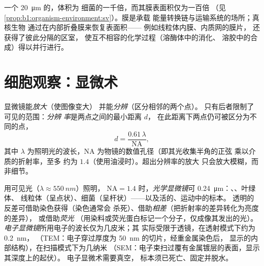 \begin{example}[为何真核细胞要分隔成区室]\label{ex:b1:cell-unit-of-life:whycompart}
一个 \qty{20}{\micro m} 的，体积为
细菌的一千倍，而其膜表面积仅为一百倍
（见\cref{prop:b1:organism-environment:sv}）。膜是承载
能量转换链与运输系统的场所；真核生物
通过在内部折叠膜来恢复表面积——
例如线粒体内膜、内质网的膜片，
还获得了彼此分隔的区室，
使互不相容的化学过程（溶酶体中的消化、
溶胶中的合成）得以并行进行。
\end{example}

\section{细胞观察：显微术}

\begin{definition}[放大率与分辨率]\label{def:b1:cell-unit-of-life:resolution}
显微镜能\emph{放大}（使图像变大）
并能\emph{分辨}（区分相邻的两个点）。
只有后者限制了可见的范围：\emph{分辨
率}是两点之间的最小距离 $d$，
在此距离下两点仍可被区分为不同的点，
\[
d = \frac{0.61\,\lambda}{\mathrm{NA}},
\]
其中 $\lambda$ 为照明光的波长，$\mathrm{NA}$
为物镜的数值孔径（即其光收集半角的正弦
乘以介质的折射率，至多
约为 $1.4$（使用油浸时）。超出分辨率的放大
只会放大模糊，而非细节。
\end{definition}

\begin{proposition}[光学显微镜与电子显微镜]\label{prop:b1:cell-unit-of-life:microscopes}
用可见光（$\lambda \approx \qty{550}{nm}$）照明，
$\mathrm{NA} = 1.4$ 时，\emph{光学显微镜}可 \qty{0.24}{\micro m}：、、叶绿体、
线粒体（呈点状）、细菌（呈杆状）——以及活的、运动中的标本。
透明的反差可借助染色获得（染色通常会
杀死）、借助\emph{相差}（把折射率的差异转化为亮度的差异），
或借助\emph{荧光}
（用染料或荧光蛋白标记一个分子，仅成像其发出的光）。
\emph{电子显微镜}所用电子的波长仅为几皮米；其
实际受限于透镜，在透射模式下约为 \qty{0.2}{nm}，
（TEM：电子穿过厚度为 \qty{50}{nm} 的切片，经重金属染色后，
显示的内部结构），在扫描模式下为几纳米
（SEM：电子束扫过覆有金属镀层的表面，显示其深度上的起伏）。
电子显微术需要真空，
标本须已死亡、固定并脱水。
\end{proposition}


